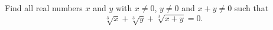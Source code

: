 Find all real numbers $x$ and $y$ with $x\ne0$, $y\ne0$ and $x+y\ne0$ such that
\[\sqrt[3]{x}+\sqrt[3]{y}+\sqrt[3]{x+y}=0.\]
